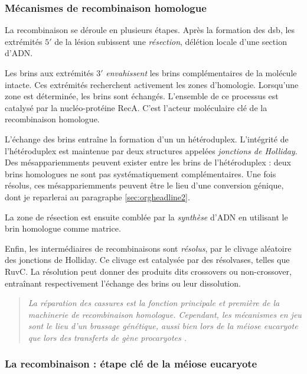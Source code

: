 \documentclass[11pt, oneside]{scrartcl}
\begin{document}
\subsubsection{Mécanismes de recombinaison homologue}
\label{sec:orgheadline3}

La recombinaison se déroule en plusieurs étapes. Après la formation des
\ac{dsb}, les extrémités \(5'\) de la lésion subissent une \emph{résection}, délétion
locale d'une section d'ADN. 

Les brins aux extrémités \(3'\) \emph{envahissent} les brins complémentaires de la
molécule intacte. Ces extrémités recherchent activement les zones d'homologie.
Lorsqu'une zone est déterminée, les brins sont échangés. L'ensemble de ce
processus est catalysé par la nucléo-protéine RecA\cite{chen_mechanism_2008}.
C'est l'acteur moléculaire clé de la recombinaison homologue.

L'échange des brins entraîne la formation d'un un hétéroduplex. L'intégrité de
l'hétéroduplex est maintenue par deux structures appelées \emph{jonctions de
Holliday}. Des mésappariemments peuvent exister entre les brins de
l'hétéroduplex : deux brins homologues ne sont pas systématiquement
complémentaires. Une fois résolus, ces mésappariemments peuvent être le lieu
d'une conversion génique, dont je reparlerai au paragraphe \ref{sec:orgheadline2}.

La zone de résection est ensuite comblée par la \emph{synthèse} d'ADN en utilisant le
brin homologue comme matrice.

Enfin, les intermédiaires de recombinaisons sont \emph{résolus}, par le clivage
aléatoire des jonctions de Holliday. Ce clivage est catalysée par des
résolvases, telles que RuvC\cite{gorecka_crystal_2013}. La résolution peut
donner des produits dits crossovers ou non-crossover, entraînant respectivement
l'échange des brins ou leur dissolution\cite{mancera_high-resolution_2008}.

\begin{quote}
{\em 
  La réparation des cassures est la fonction principale et \emph{première} de la
  machinerie de recombinaison homologue. Cependant, les mécanismes en jeu sont le
  lieu d'un brassage génétique, aussi bien lors de la méiose eucaryote que lors
  des transferts de gène procaryotes \cite{redfield_bacteria_2001}.
}
\end{quote}

\subsubsection{La recombinaison : étape clé de la méiose eucaryote}
\label{sec:orgheadline4}
\end{document}
